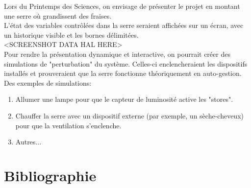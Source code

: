 \documentclass[a4paper,10pt]{article}
\begin{document}
Lors du Printemps des Sciences, on envisage de présenter le projet en montant une serre où grandissent des fraises. \\

L'état des variables contrôlées dans la serre seraient affichées sur un écran, avec un historique visible et les bornes délimitées. \\

<SCREENSHOT DATA HAL HERE> \\

Pour rendre la présentation dynamique et interactive, on pourrait créer des simulations de "perturbation" du système. Celles-ci enclencheraient les dispositifs installés et prouveraient que la serre fonctionne théoriquement en auto-gestion. Des exemples de simulations: \\

\begin{enumerate}
	\item Allumer une lampe pour que le capteur de luminosité active les "stores".
	\item Chauffer la serre avec un dispositif externe (par exemple, un sèche-cheveux) pour que la ventilation s'enclenche. 
	\item Autres... \\
\end{enumerate}

\section{Bibliographie}
\end{document}
